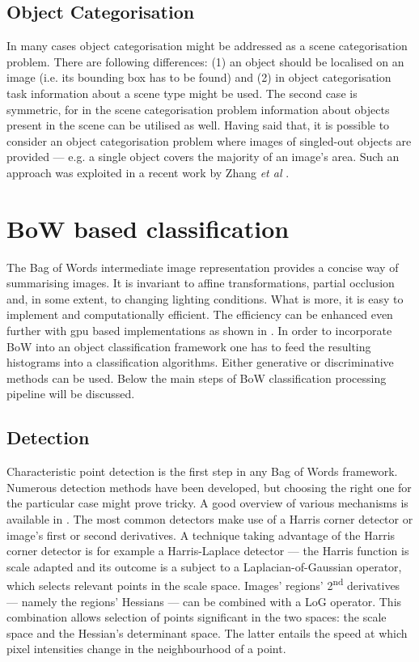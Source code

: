 \documentclass[a4paper,12pt]{article}
\begin{document}
  \subsection{Object Categorisation}
  
  In many cases object categorisation might be addressed as a scene categorisation problem. There are following differences: (1) an object should be localised on an image (i.e. its bounding box has to be found) and (2) in object categorisation task information about a scene type might be used. The second case is symmetric, for in the scene categorisation problem information about objects present in the scene can be utilised as well. Having said that, it is possible to consider an object categorisation problem where images of singled-out objects are provided --- e.g. a single object covers the majority of an image's area. Such an approach was exploited in a recent work by Zhang \emph{et al} \cite{zhangcategory}. 
  

\section{BoW based classification}

	The Bag of Words intermediate image representation provides a concise way of summarising images. It is invariant to affine transformations, partial occlusion and, in some extent, to changing lighting conditions. What is more, it is easy to implement and computationally efficient. The efficiency can be enhanced even further with gpu based implementations as shown in \cite{van2011empowering}. In order to incorporate BoW into an object classification framework one has to feed the resulting histograms into a classification algorithms. Either generative or discriminative methods can be used. Below the main steps of BoW classification processing pipeline will be discussed.

\subsection{Detection}

	Characteristic point detection is the first step in any Bag of Words framework. Numerous detection methods have been developed, but choosing the right one for the particular case might prove tricky. A good overview of various mechanisms is available in \cite{tsai2012bag}. The most common detectors make use of a Harris corner detector or image's first or second derivatives. A technique taking advantage of the Harris corner detector is for example a Harris-Laplace detector --- the Harris function is scale adapted and its outcome is a subject to a Laplacian-of-Gaussian operator, which selects relevant points in the scale space. Images' regions' 2\textsuperscript{nd} derivatives --- namely the regions' Hessians --- can be combined with a LoG operator. This combination allows selection of points significant in the two spaces: the scale space and the Hessian's determinant space. The latter entails the speed at which pixel intensities change in the neighbourhood of a point.	
	
\end{document}

